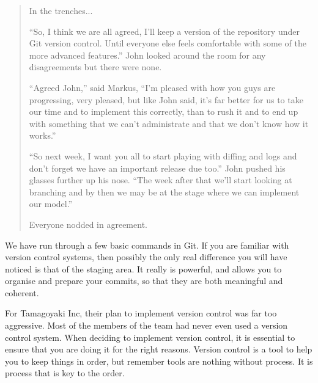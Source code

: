 \begin{quote}In the trenches...

``So, I think we are all agreed, I'll keep a version of the repository under Git version control.  Until everyone else feels comfortable with some of the more advanced features.''  John looked around the room for any disagreements but there were none.

``Agreed John,'' said Markus, ``I'm pleased with how you guys are progressing, very pleased, but like John said, it's far better for us to take our time and to implement this correctly, than to rush it and to end up with something that we can't administrate and that we don't know how it works.''

``So next week, I want you all to start playing with diffing and logs and don't forget we have an important release due too.''  John pushed his glasses further up his nose.  ``The week after that we'll start looking at branching and by then we may be at the stage where we can implement our model.''

Everyone nodded in agreement.
\end{quote}

We have run through a few basic commands in Git.  If you are familiar with version control systems, then possibly the only real difference you will have noticed is that of the staging area.  It really is powerful, and allows you to organise and prepare your commits, so that they are both meaningful and coherent.

For Tamagoyaki Inc, their plan to implement version control was far too aggressive.  Most of the members of the team had never even used a version control system.  When deciding to implement version control, it is essential to ensure that you are doing it for the right reasons.  Version control is a tool to help you to keep things in order, but remember tools are nothing without process.  It is process that is key to the order.
